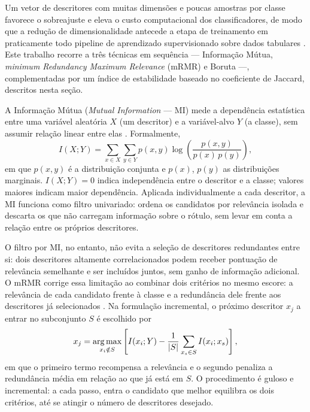 Um vetor de descritores com muitas dimensões e poucas amostras por classe favorece o sobreajuste e eleva o custo computacional dos classificadores, de modo que a redução de dimensionalidade antecede a etapa de treinamento em praticamente todo pipeline de aprendizado supervisionado sobre dados tabulares \cite{guyon2003}. Este trabalho recorre a três técnicas em sequência --- Informação Mútua, \emph{minimum Redundancy Maximum Relevance} (mRMR) e Boruta ---, complementadas por um índice de estabilidade baseado no coeficiente de Jaccard, descritos nesta seção.

A Informação Mútua (\emph{Mutual Information} --- MI) mede a dependência estatística entre uma variável aleatória $X$ (um descritor) e a variável-alvo $Y$ (a classe), sem assumir relação linear entre elas \cite{cover_thomas_2006}. Formalmente,
\begin{equation}
I(X;Y) = \sum_{x \in X}\sum_{y \in Y} p(x,y) \log\left(\frac{p(x,y)}{p(x)\,p(y)}\right),
\end{equation}
em que $p(x,y)$ é a distribuição conjunta e $p(x)$, $p(y)$ as distribuições marginais. $I(X;Y) = 0$ indica independência entre o descritor e a classe; valores maiores indicam maior dependência. Aplicada individualmente a cada descritor, a MI funciona como filtro univariado: ordena os candidatos por relevância isolada e descarta os que não carregam informação sobre o rótulo, sem levar em conta a relação entre os próprios descritores.

O filtro por MI, no entanto, não evita a seleção de descritores redundantes entre si: dois descritores altamente correlacionados podem receber pontuação de relevância semelhante e ser incluídos juntos, sem ganho de informação adicional. O mRMR corrige essa limitação ao combinar dois critérios no mesmo escore: a relevância de cada candidato frente à classe e a redundância dele frente aos descritores já selecionados \cite{peng_mrmr_2005}. Na formulação incremental, o próximo descritor $x_j$ a entrar no subconjunto $S$ é escolhido por
\begin{equation}
x_j = \operatorname*{arg\,max}_{x_i \notin S} \left[ I(x_i; Y) - \frac{1}{|S|}\sum_{x_s \in S} I(x_i; x_s) \right],
\end{equation}
em que o primeiro termo recompensa a relevância e o segundo penaliza a redundância média em relação ao que já está em $S$. O procedimento é guloso e incremental: a cada passo, entra o candidato que melhor equilibra os dois critérios, até se atingir o número de descritores desejado.

